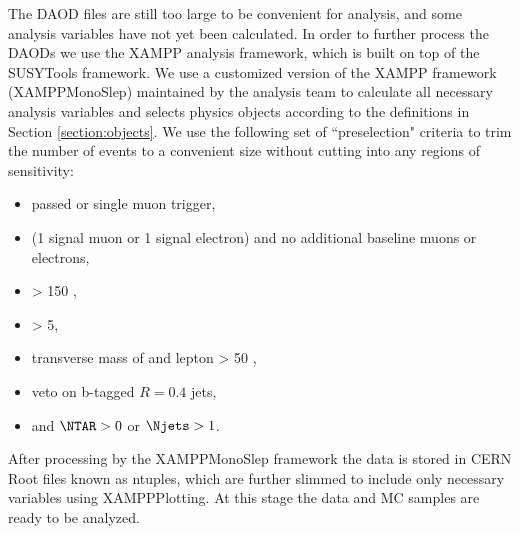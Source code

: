 The DAOD files are still too large to be convenient for analysis, and some analysis variables have not yet been calculated. In order to further process the DAODs we use the XAMPP analysis framework, which is built on top of the SUSYTools framework. We use a customized version of the XAMPP framework (XAMPPMonoSlep) maintained by the analysis team to calculate all necessary analysis variables and selects physics objects according to the definitions in Section \ref{section:objects}. We use the following set of ``preselection" criteria to trim the number of events to a convenient size without cutting into any regions of sensitivity:
\begin{itemize}
\item passed \met or single muon trigger,
\item (1 signal muon or 1 signal electron) and no additional baseline muons or electrons,
\item \met > 150 \GeV,
\item \metsig > 5,
\item transverse mass of \met and lepton \mtlepmet > 50 \GeV,
\item veto on b-tagged $R=0.4$ jets,
\item and \(\NTAR > 0\) or \(\Njets > 1\).
\end{itemize}

After processing by the XAMPPMonoSlep framework the data is stored in CERN Root files known as ntuples, which are further slimmed to include only necessary variables using XAMPPPlotting. At this stage the data and MC samples are ready to be analyzed.
